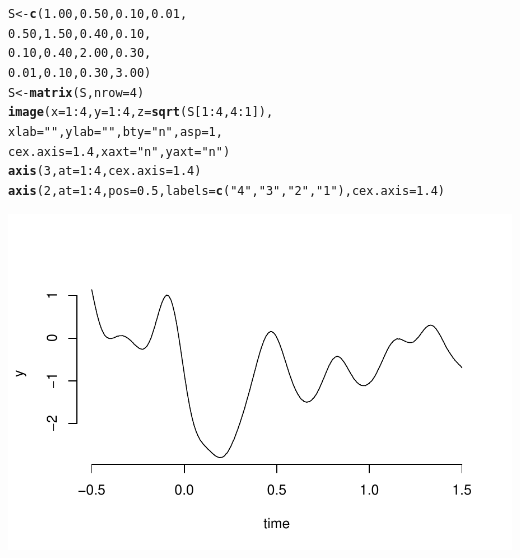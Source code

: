 \documentclass[a4paper,11pt]{article}\usepackage[]{graphicx}\usepackage[]{color}
\makeatletter
\def\maxwidth{ %
  \ifdim\Gin@nat@width>\linewidth
    \linewidth
  \else
    \Gin@nat@width
  \fi
}
\newcommand{\hlnum}[1]{\textcolor[rgb]{0.686,0.059,0.569}{#1}}%
\newcommand{\hlstr}[1]{\textcolor[rgb]{0.192,0.494,0.8}{#1}}%
\newcommand{\hlopt}[1]{\textcolor[rgb]{0,0,0}{#1}}%
\newcommand{\hlstd}[1]{\textcolor[rgb]{0.345,0.345,0.345}{#1}}%
\newcommand{\hlkwb}[1]{\textcolor[rgb]{0.69,0.353,0.396}{#1}}%
\newcommand{\hlkwc}[1]{\textcolor[rgb]{0.333,0.667,0.333}{#1}}%
\newcommand{\hlkwd}[1]{\textcolor[rgb]{0.737,0.353,0.396}{\textbf{#1}}}%
\newenvironment{kframe}{%
 \def\at@end@of@kframe{}%
 \ifinner\ifhmode%
  \def\at@end@of@kframe{\end{minipage}}%
  \begin{minipage}{\columnwidth}%
 \fi\fi%
 \def\FrameCommand##1{\hskip\@totalleftmargin \hskip-\fboxsep
 \colorbox{shadecolor}{##1}\hskip-\fboxsep
     \hskip-\linewidth \hskip-\@totalleftmargin \hskip\columnwidth}%
 \MakeFramed {\advance\hsize-\width
   \@totalleftmargin\z@ \linewidth\hsize
   \@setminipage}}%
 {\par\unskip\endMakeFramed%
 \at@end@of@kframe}
\newenvironment{knitrout}{}{} %
\makeatother
\begin{document}
\begin{knitrout}
\color{fgcolor}\begin{kframe}
\begin{alltt}
  \hlstd{S} \hlkwb{<-} \hlkwd{c}\hlstd{(}\hlnum{1.00}\hlstd{,} \hlnum{0.50}\hlstd{,} \hlnum{0.10}\hlstd{,} \hlnum{0.01}\hlstd{,}
         \hlnum{0.50}\hlstd{,} \hlnum{1.50}\hlstd{,} \hlnum{0.40}\hlstd{,} \hlnum{0.10}\hlstd{,}
         \hlnum{0.10} \hlstd{,}\hlnum{0.40} \hlstd{,}\hlnum{2.00} \hlstd{,}\hlnum{0.30}\hlstd{,}
         \hlnum{0.01}\hlstd{,} \hlnum{0.10}\hlstd{,} \hlnum{0.30}\hlstd{,} \hlnum{3.00}\hlstd{)}
\hlstd{S} \hlkwb{<-} \hlkwd{matrix}\hlstd{(S,} \hlkwc{nrow}\hlstd{=}\hlnum{4}\hlstd{)}
\hlkwd{image}\hlstd{(}\hlkwc{x}\hlstd{=}\hlnum{1}\hlopt{:}\hlnum{4}\hlstd{,} \hlkwc{y}\hlstd{=}\hlnum{1}\hlopt{:}\hlnum{4}\hlstd{,} \hlkwc{z}\hlstd{=}\hlkwd{sqrt}\hlstd{(S[}\hlnum{1}\hlopt{:}\hlnum{4}\hlstd{,}\hlnum{4}\hlopt{:}\hlnum{1}\hlstd{]),}
      \hlkwc{xlab}\hlstd{=}\hlstr{""}\hlstd{,} \hlkwc{ylab}\hlstd{=}\hlstr{""}\hlstd{,} \hlkwc{bty} \hlstd{=} \hlstr{"n"}\hlstd{,} \hlkwc{asp}\hlstd{=}\hlnum{1}\hlstd{,}
      \hlkwc{cex.axis}\hlstd{=}\hlnum{1.4}\hlstd{,} \hlkwc{xaxt}\hlstd{=}\hlstr{"n"}\hlstd{,} \hlkwc{yaxt}\hlstd{=}\hlstr{"n"}\hlstd{)}
\hlkwd{axis}\hlstd{(}\hlnum{3}\hlstd{,} \hlkwc{at} \hlstd{=} \hlnum{1}\hlopt{:}\hlnum{4}\hlstd{,} \hlkwc{cex.axis}\hlstd{=}\hlnum{1.4}\hlstd{)}
\hlkwd{axis}\hlstd{(}\hlnum{2}\hlstd{,} \hlkwc{at} \hlstd{=} \hlnum{1}\hlopt{:}\hlnum{4}\hlstd{,} \hlkwc{pos} \hlstd{=} \hlnum{0.5}\hlstd{,} \hlkwc{labels}\hlstd{=}\hlkwd{c}\hlstd{(}\hlstr{"4"}\hlstd{,}\hlstr{"3"}\hlstd{,}\hlstr{"2"}\hlstd{,}\hlstr{"1"}\hlstd{),} \hlkwc{cex.axis}\hlstd{=}\hlnum{1.4}\hlstd{)}
\end{alltt}
\end{kframe}

{\centering \includegraphics[width=\maxwidth]{figure/unnamed-chunk-4-1} 

}



\end{knitrout}
\end{document}
